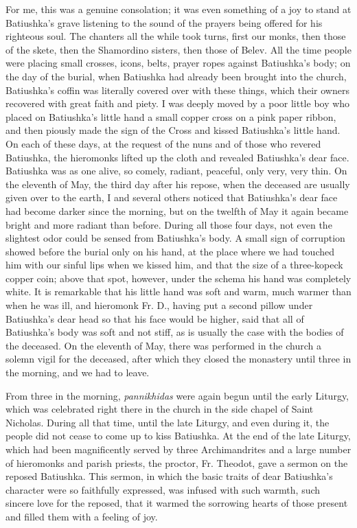 For me, this was a genuine consolation; it was even something of a joy to stand at Batiushka's grave listening to the sound of the prayers being offered for his righteous soul. The chanters all the while took turns, first our monks, then those of the skete, then the Shamordino sisters, then those of Belev. All the time people were placing small crosses, icons, belts, prayer ropes against Batiushka's body; on the day of the burial, when Batiushka had already been brought into the church, Batiushka's coffin was literally covered over with these things, which their owners recovered with great faith and piety. I was deeply moved by a poor little boy who placed on Batiushka's little hand a small copper cross on a pink paper ribbon, and then piously made the sign of the Cross and kissed Batiushka's little hand. On each of these days, at the request of the nuns and of those who revered Batiushka, the hieromonks lifted up the cloth and revealed Batiushka's dear face. Batiushka was as one alive, so comely, radiant, peaceful, only very, very thin. On the eleventh of May, the third day after his repose, when the deceased are usually given over to the earth, I and several others noticed that Batiushka's dear face had become darker since the morning, but on the twelfth of May it again became bright and more radiant than before. During all those four days, not even the slightest odor could be sensed from Batiushka's body. A small sign of corruption showed before the burial only on his hand, at the place where we had touched him with our sinful lips when we kissed him, and that the size of a three-kopeck copper coin; above that spot, however, under the schema his hand was completely white. It is remarkable that his little hand was soft and warm, much warmer than when he was ill, and hieromonk Fr. D., having put a second pillow under Batiushka's dear head so that his face would be higher, said that all of Batiushka's body was soft and not stiff, as is usually the case with the bodies of the deceased. On the eleventh of May, there was performed in the church a solemn vigil for the deceased, after which they closed the monastery until three in the morning, and we had to leave.

From three in the morning, \textit{pannikhidas} were again begun until the early Liturgy, which was celebrated right there in the church in the side chapel of Saint Nicholas. During all that time, until the late Liturgy, and even during it, the people did not cease to come up to kiss Batiushka. At the end of the late Liturgy, which had been magnificently served by three Archimandrites and a large number of hieromonks and parish priests, the proctor, Fr. Theodot, gave a sermon on the reposed Batiushka. This sermon, in which the basic traits of dear Batiushka's character were so faithfully expressed, was infused with such warmth, such sincere love for the reposed, that it warmed the sorrowing hearts of those present and filled them with a feeling of joy.

